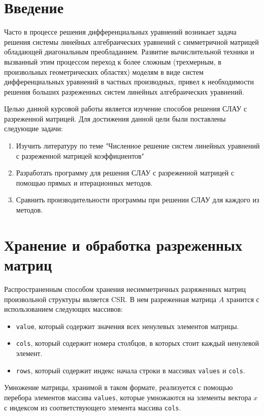 \documentclass[a4paper, fontsize=14pt]{article}
\begin{document}

\newpage

\tableofcontents

\newpage

\section*{Введение}

Часто в процессе решения дифференциальных уравнений возникает задача решения системы линейных
алгебраических уравнений с симметричной матрицей обладающей диагональным преобладанием. 
Развитие вычислительной техники и вызванный этим процессом переход к более сложным (трехмерным, 
в произвольных геометрических областях) моделям в виде систем дифференциальных уравнений в 
частных производных, привел к необходимости решения больших разреженных систем линейных
алгебраических уравнений.

Целью данной курсовой работы является изучение способов решения СЛАУ с разреженной матрицей.
Для достижения данной цели были поставлены следующие задачи:
\begin{enumerate}
    \item Изучить литературу по теме "Численное решение систем линейных уравнений с разреженной
        матрицей коэффициентов"
    \item Разработать программу для решения СЛАУ с разреженной матрицей с помощью прямых и
        итерационных методов.
    \item Сравнить производительности программы при решении СЛАУ для каждого из методов.
\end{enumerate}
\newpage
\section{Хранение и обработка разреженных матриц}
Распространенным способом хранения несимметричных разряженных матриц произвольной структуры является
CSR. В нем разреженная матрица $A$ хранится с использованием следующих массивов:
\begin{itemize}
    \item \verb|value|, который содержит значения всех ненулевых элементов матрицы.
    \item \verb|cols|, который содержит номера столбцов, в которых стоит каждый ненулевой элемент.
    \item \verb|rows|, который содержит индекс начала строки в массивах \verb|values| и \verb|cols|.
\end{itemize}
Умножение матрицы, хранимой в таком формате, реализуется с помощью перебора элементов массива
\verb|values|, которые умножаются на элементы вектора $x$ с индексом из соответствующего
элемента массива \verb|cols|.\cite{bal} 
\end{document}
